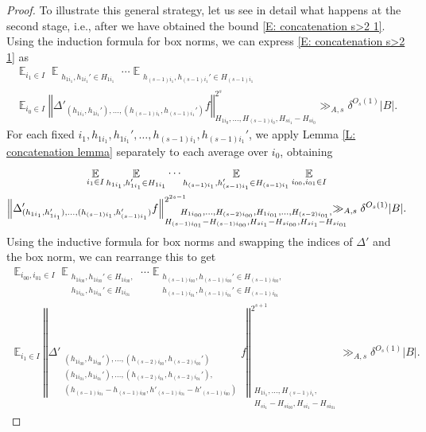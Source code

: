 \documentclass[11pt]{amsart}
\theoremstyle{definition}
\DeclareMathOperator*{\E}{\mathbb{E}}
\newcommand{\norm}[1]{\left\Vert #1\right\Vert}
\begin{document}
\begin{proof}
To illustrate this general strategy, let us see in detail what happens at the second stage, i.e., after we have obtained the bound \eqref{E: concatenation s>2 1}. Using the induction formula for box norms, we can express \eqref{E: concatenation s>2 1} as
\begin{multline*}
    \E_{i_1\in I} \E_{\substack{h_{1i_1}, h_{1i_1}'\in H_{1i_1}}} \cdots \E_{\substack{h_{(s-1) i_1}, h_{(s-1) i_1}' \in H_{(s-1) i_1}}}\\ \E_{i_0\in I} \norm{\Delta'_{(h_{1i_1}, h_{1i_1}'), \ldots, (h_{(s-1)i_1}, h_{(s-1)i_1}')} f}_{H_{1 i_0}, \ldots, H_{(s-1) i_0}, H_{s i_1}-H_{s i_0}}^{2^{s}}\gg_{A, s} \delta^{O_s(1)} |B|.
\end{multline*}
 For each fixed $i_1, h_{1i_1}, h_{1i_1}', \ldots, h_{(s-1) i_1}, h_{(s-1) i_1}'$, we apply Lemma \ref{L: concatenation lemma} separately to each average over $i_0$, obtaining
\begin{multline*}
    \E_{i_1\in I} \E_{\substack{h_{1i_1}, h_{1i_1}'\in H_{1i_1}}} \cdots \E_{\substack{h_{(s-1) i_1}, h_{(s-1) i_1}' \in H_{(s-1) i_1}}} \E_{i_{00}, i_{01}\in I}\\
    \norm{\Delta'_{(h_{1i_1}, h_{1i_1}'), \ldots, (h_{(s-1)i_1}, h_{(s-1)i_1}')} f}_{\substack{H_{1 i_{00}}, \ldots, H_{(s-2) i_{00}}, H_{1 i_{01}}, \ldots, H_{(s-2) i_{01}},\\ H_{(s-1) i_{01}}-H_{(s-1) i_{00}}, H_{s i_1}-H_{s i_{00}}, H_{s i_1}-H_{s i_{01}}}}^{2^{2s-1}} \hspace{-6mm} \gg_{A, s} \delta^{O_s(1)} |B|.
\end{multline*}
Using the inductive formula for box norms and swapping the indices of $\Delta'$ and the box norm, we can rearrange this to get 
\begin{multline*}
    \E_{i_{00}, i_{01}\in I} \E_{\substack{h_{1i_{00}}, h_{1i_{00}}'\in H_{1i_{00}},\\ h_{1i_{01}}, h_{1i_{01}}'\in H_{1i_{01}}}}\cdots 
    \E_{\substack{h_{(s-1) i_{00}}, h_{(s-1) i_{00}}'\in H_{(s-1) i_{00}},\\ h_{(s-1) i_{01}}, h_{(s-1) i_{01}}'\in H_{(s-1) i_{01}}}}\\
    \E_{i_1\in I} \norm{\Delta'_{\substack{(h_{1 i_{00}}, h_{1 i_{00}}'), \ldots, (h_{(s-2) i_{00}}, h_{(s-2) i_{00}}')\\ (h_{1 i_{01}}, h_{1 i_{01}}'), \ldots, (h_{(s-2) i_{01}}, h_{(s-2) i_{01}}'),\\ (h_{(s-1) i_{01}} - h_{(s-1) i_{00}}, h'_{(s-1) i_{01}} - h'_{(s-1) i_{00}}) }} f}_{\substack{H_{1 i_1}, \ldots, H_{(s-1) i_1},\\ H_{s i_1}-H_{s i_{00}}, H_{s i_1}-H_{s i_{01}}}}^{2^{s+1}} \gg_{A, s} \delta^{O_s(1)} |B|.     

\end{multline*}
\end{proof}
\end{document}

